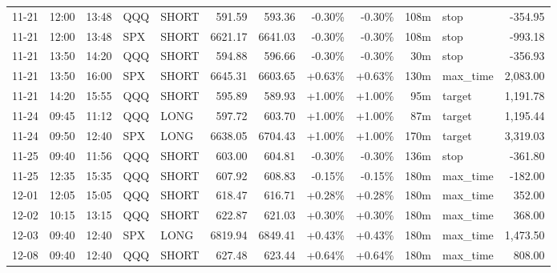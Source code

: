 \documentclass[11pt,a4paper,twoside]{article}
\begin{document}
\begin{center}
\begin{longtable}{>{\color{txtmain}}l l l l l r r r r r >{\color{txtmain}}l r}
11-21 & 12:00 & 13:48 & QQQ & SHORT & 591.59 & 593.36 & \textcolor{lossred}{-0.30\%} & \textcolor{lossred}{-0.30\%} & 108m & stop & \textcolor{lossred}{-354.95} \\
11-21 & 12:00 & 13:48 & SPX & SHORT & 6621.17 & 6641.03 & \textcolor{lossred}{-0.30\%} & \textcolor{lossred}{-0.30\%} & 108m & stop & \textcolor{lossred}{-993.18} \\
11-21 & 13:50 & 14:20 & QQQ & SHORT & 594.88 & 596.66 & \textcolor{lossred}{-0.30\%} & \textcolor{lossred}{-0.30\%} & 30m & stop & \textcolor{lossred}{-356.93} \\
11-21 & 13:50 & 16:00 & SPX & SHORT & 6645.31 & 6603.65 & \textcolor{wingreen}{+0.63\%} & \textcolor{wingreen}{+0.63\%} & 130m & max\_time & \textcolor{wingreen}{2,083.00} \\
11-21 & 14:20 & 15:55 & QQQ & SHORT & 595.89 & 589.93 & \textcolor{wingreen}{+1.00\%} & \textcolor{wingreen}{+1.00\%} & 95m & target & \textcolor{wingreen}{1,191.78} \\
11-24 & 09:45 & 11:12 & QQQ & LONG & 597.72 & 603.70 & \textcolor{wingreen}{+1.00\%} & \textcolor{wingreen}{+1.00\%} & 87m & target & \textcolor{wingreen}{1,195.44} \\
11-24 & 09:50 & 12:40 & SPX & LONG & 6638.05 & 6704.43 & \textcolor{wingreen}{+1.00\%} & \textcolor{wingreen}{+1.00\%} & 170m & target & \textcolor{wingreen}{3,319.03} \\
11-25 & 09:40 & 11:56 & QQQ & SHORT & 603.00 & 604.81 & \textcolor{lossred}{-0.30\%} & \textcolor{lossred}{-0.30\%} & 136m & stop & \textcolor{lossred}{-361.80} \\
11-25 & 12:35 & 15:35 & QQQ & SHORT & 607.92 & 608.83 & \textcolor{lossred}{-0.15\%} & \textcolor{lossred}{-0.15\%} & 180m & max\_time & \textcolor{lossred}{-182.00} \\
12-01 & 12:05 & 15:05 & QQQ & SHORT & 618.47 & 616.71 & \textcolor{wingreen}{+0.28\%} & \textcolor{wingreen}{+0.28\%} & 180m & max\_time & \textcolor{wingreen}{352.00} \\
12-02 & 10:15 & 13:15 & QQQ & SHORT & 622.87 & 621.03 & \textcolor{wingreen}{+0.30\%} & \textcolor{wingreen}{+0.30\%} & 180m & max\_time & \textcolor{wingreen}{368.00} \\
12-03 & 09:40 & 12:40 & SPX & LONG & 6819.94 & 6849.41 & \textcolor{wingreen}{+0.43\%} & \textcolor{wingreen}{+0.43\%} & 180m & max\_time & \textcolor{wingreen}{1,473.50} \\
12-08 & 09:40 & 12:40 & QQQ & SHORT & 627.48 & 623.44 & \textcolor{wingreen}{+0.64\%} & \textcolor{wingreen}{+0.64\%} & 180m & max\_time & \textcolor{wingreen}{808.00} \\

\end{longtable}
\end{center}
\end{document}
